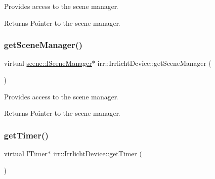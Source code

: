 Provides access to the scene manager. 

\begin{DoxyReturn}{Returns}
Pointer to the scene manager. 
\end{DoxyReturn}
\mbox{\label{classirr_1_1IrrlichtDevice_a891b503ff4d5041296d88f23f97d7b3d}} 
\subsubsection{\texorpdfstring{get\+Scene\+Manager()}{getSceneManager()}\hspace{0.1cm}{\footnotesize\ttfamily [2/2]}}
{\footnotesize\ttfamily virtual \hyperlink{classirr_1_1scene_1_1ISceneManager}{scene\+::\+I\+Scene\+Manager}$\ast$ irr\+::\+Irrlicht\+Device\+::get\+Scene\+Manager (\begin{DoxyParamCaption}{ }\end{DoxyParamCaption})\hspace{0.3cm}{\ttfamily [pure virtual]}}



Provides access to the scene manager. 

\begin{DoxyReturn}{Returns}
Pointer to the scene manager. 
\end{DoxyReturn}
\mbox{\label{classirr_1_1IrrlichtDevice_a96c30fb7f644e1d1dabff563bde26460}} 
\subsubsection{\texorpdfstring{get\+Timer()}{getTimer()}\hspace{0.1cm}{\footnotesize\ttfamily [1/2]}}
{\footnotesize\ttfamily virtual \hyperlink{classirr_1_1ITimer}{I\+Timer}$\ast$ irr\+::\+Irrlicht\+Device\+::get\+Timer (\begin{DoxyParamCaption}{ }\end{DoxyParamCaption})\hspace{0.3cm}{\ttfamily [pure virtual]}}



